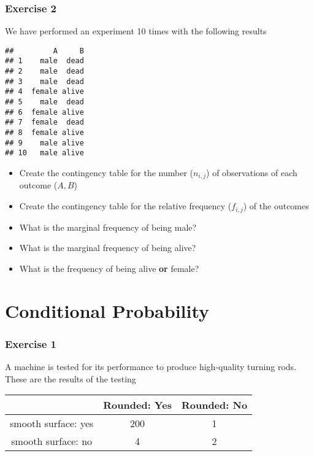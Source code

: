 \documentclass[
]{book}
\providecommand{\tightlist}{%
  \setlength{\itemsep}{0pt}\setlength{\parskip}{0pt}}
\begin{document}
\hypertarget{exercise-2-1}{%
\subsubsection{Exercise 2}\label{exercise-2-1}}

We have performed an experiment 10 times with the following results

\begin{verbatim}
##         A     B
## 1    male  dead
## 2    male  dead
## 3    male  dead
## 4  female alive
## 5    male  dead
## 6  female alive
## 7  female  dead
## 8  female alive
## 9    male alive
## 10   male alive
\end{verbatim}

\begin{itemize}
\tightlist
\item
  Create the contingency table for the number (\(n_{i,j}\)) of observations of each outcome (\(A,B\))
\item
  Create the contingency table for the relative frequency (\(f_{i,j}\)) of the outcomes
\item
  What is the marginal frequency of being male?
\item
  What is the marginal frequency of being alive?
\item
  What is the frequency of being alive \textbf{or} female?
\end{itemize}

\hypertarget{conditional-probability-3}{%
\section{Conditional Probability}\label{conditional-probability-3}}

\hypertarget{exercise-1-2}{%
\subsubsection{Exercise 1}\label{exercise-1-2}}

A machine is tested for its performance to produce high-quality turning rods. These are the results of the testing

\begin{longtable}[]{@{}ccc@{}}
\toprule
& Rounded: Yes & Rounded: No \\
\midrule
\endhead
smooth surface: yes & 200 & 1 \\
smooth surface: no & 4 & 2 \\
\bottomrule
\end{longtable}
\end{document}
